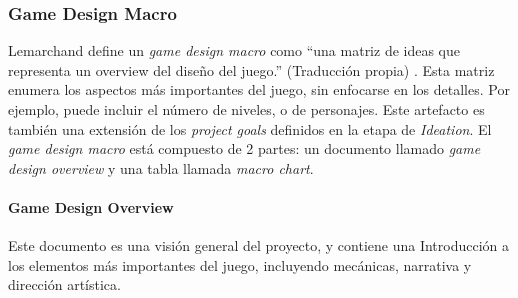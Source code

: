 \subsubsection{Game Design Macro}
\par Lemarchand define un \textit{game design macro} como ``una matriz de ideas que representa un overview del diseño del juego.'' (Traducción propia) \cite{lemarchandPlayfulProductionProcess2021}. Esta matriz enumera los aspectos más importantes del juego, sin enfocarse en los detalles. Por ejemplo, puede incluir el número de niveles, o de personajes. Este artefacto es también una extensión de los \textit{project goals} definidos en la etapa de \textit{Ideation}. El \textit{game design macro} está compuesto de 2 partes: un documento llamado \textit{game design overview} y una tabla llamada \textit{macro chart}.
%
\paragraph{Game Design Overview} Este documento es una visión general del proyecto, y contiene una Introducción a los elementos más importantes del juego, incluyendo mecánicas, narrativa y dirección artística. 
%
